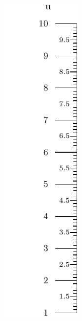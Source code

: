 \documentclass[a4paper,11pt,english]{sphinxmanual}
\begin{document}
\includegraphics{ex_axes_3.pdf}
\end{document}
